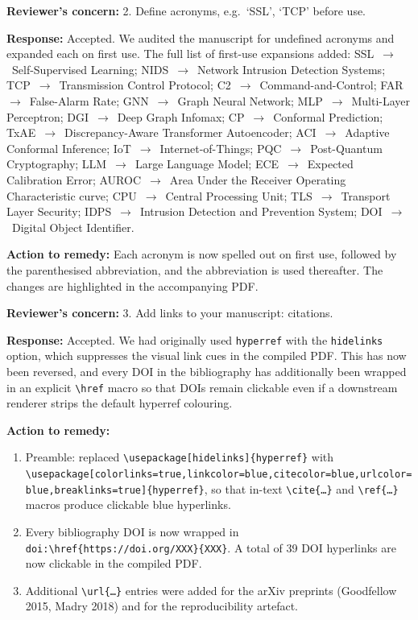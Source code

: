 \documentclass[11pt,a4paper]{article}
\newcommand{\Concern}[1]{\smallskip\noindent\textbf{\textcolor{concern}{Reviewer's concern:}} #1\par}
\newcommand{\Response}[1]{\noindent\textbf{\textcolor{response}{Response:}} #1\par}
\newcommand{\Action}[1]{\noindent\textbf{\textcolor{action}{Action to remedy:}} #1\par}
\begin{document}
\Concern{2. Define acronyms, e.g.\ `SSL', `TCP' before use.}
\Response{Accepted. We audited the manuscript for undefined acronyms and expanded each on first use. The full list of first-use expansions added: SSL~$\rightarrow$~Self-Supervised Learning; NIDS~$\rightarrow$~Network Intrusion Detection Systems; TCP~$\rightarrow$~Transmission Control Protocol; C2~$\rightarrow$~Command-and-Control; FAR~$\rightarrow$~False-Alarm Rate; GNN~$\rightarrow$~Graph Neural Network; MLP~$\rightarrow$~Multi-Layer Perceptron; DGI~$\rightarrow$~Deep Graph Infomax; CP~$\rightarrow$~Conformal Prediction; TxAE~$\rightarrow$~Discrepancy-Aware Transformer Autoencoder; ACI~$\rightarrow$~Adaptive Conformal Inference; IoT~$\rightarrow$~Internet-of-Things; PQC~$\rightarrow$~Post-Quantum Cryptography; LLM~$\rightarrow$~Large Language Model; ECE~$\rightarrow$~Expected Calibration Error; AUROC~$\rightarrow$~Area Under the Receiver Operating Characteristic curve; CPU~$\rightarrow$~Central Processing Unit; TLS~$\rightarrow$~Transport Layer Security; IDPS~$\rightarrow$~Intrusion Detection and Prevention System; DOI~$\rightarrow$~Digital Object Identifier.}
\Action{Each acronym is now spelled out on first use, followed by the parenthesised abbreviation, and the abbreviation is used thereafter. The changes are highlighted in the accompanying PDF.}

\Concern{3. Add links to your manuscript: citations.}
\Response{Accepted. We had originally used \texttt{hyperref} with the \texttt{hidelinks} option, which suppresses the visual link cues in the compiled PDF. This has now been reversed, and every DOI in the bibliography has additionally been wrapped in an explicit \texttt{\textbackslash href} macro so that DOIs remain clickable even if a downstream renderer strips the default hyperref colouring.}
\Action{
\begin{enumerate}[label=(\alph*),leftmargin=1.5em,itemsep=1pt,topsep=1pt]
  \item Preamble: replaced \texttt{\textbackslash usepackage[hidelinks]\{hyperref\}} with \texttt{\textbackslash usepackage[colorlinks=true,linkcolor=blue,citecolor=blue,urlcolor=blue,breaklinks=true]\{hyperref\}}, so that in-text \texttt{\textbackslash cite\{\ldots\}} and \texttt{\textbackslash ref\{\ldots\}} macros produce clickable blue hyperlinks.
  \item Every bibliography DOI is now wrapped in \texttt{doi:\textbackslash href\{https://doi.org/XXX\}\{XXX\}}. A total of 39 DOI hyperlinks are now clickable in the compiled PDF.
  \item Additional \texttt{\textbackslash url\{\ldots\}} entries were added for the arXiv preprints (Goodfellow 2015, Madry 2018) and for the reproducibility artefact.
\end{enumerate}}
\end{document}
